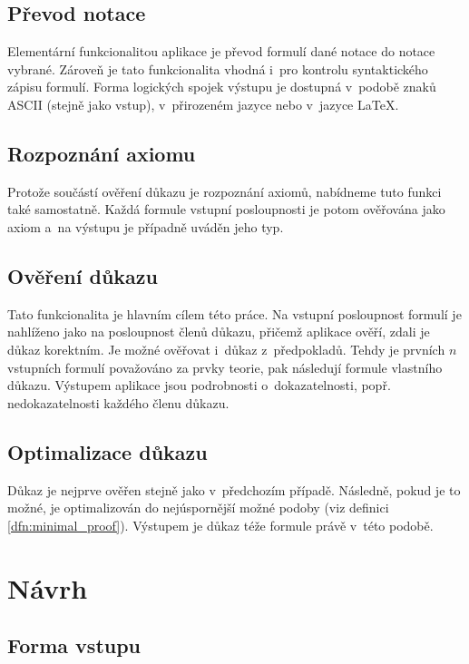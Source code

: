 \documentclass[thesis=B,czech,hidelinks]{thesis}[2012/06/26]
\begin{document}
\subsection{Převod notace}

Elementární funkcionalitou aplikace je převod formulí dané notace do notace vybrané. Zároveň je tato funkcionalita vhodná i~pro kontrolu syntaktického zápisu formulí. Forma logických spojek výstupu je dostupná v~podobě znaků ASCII (stejně jako vstup), v~přirozeném jazyce nebo v~jazyce \LaTeX.

\subsection{Rozpoznání axiomu}

Protože součástí ověření důkazu je rozpoznání axiomů, nabídneme tuto funkci také samostatně. Každá formule vstupní posloupnosti je potom ověřována jako axiom a~na výstupu je případně uváděn jeho typ.

\subsection{Ověření důkazu}

Tato funkcionalita je hlavním cílem této práce. Na vstupní posloupnost formulí je nahlíženo jako na posloupnost členů důkazu, přičemž aplikace ověří, zdali je důkaz korektním. Je možné ověřovat i~důkaz z~předpokladů. Tehdy je prvních $n$ vstupních formulí považováno za prvky teorie, pak následují formule vlastního důkazu. Výstupem aplikace jsou podrobnosti o~dokazatelnosti, popř. nedokazatelnosti každého členu důkazu.

\subsection{Optimalizace důkazu}

Důkaz je nejprve ověřen stejně jako v~předchozím případě. Následně, pokud je to možné, je optimalizován do nejúspornější možné podoby (viz definici \ref{dfn:minimal_proof}). Výstupem je důkaz téže formule právě v~této podobě.

\section{Návrh}

\subsection{Forma vstupu}
\end{document}
